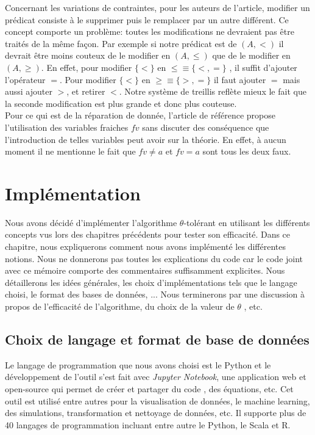 \documentclass[letterpaper, 12pt]{report}
\theoremstyle{definition}
\begin{document}
Concernant les variations de contraintes, pour les auteurs de l'article, modifier un prédicat consiste à le supprimer puis le remplacer par un autre différent. Ce concept comporte un problème: toutes les modifications ne devraient pas être traités de la même façon. Par exemple si notre prédicat est de $(A,<)$ il devrait être moins couteux de le modifier en $(A,\leq)$ que de le modifier en $(A, \geq)$. En effet, pour modifier $\{ < \}$ en $ \leq \equiv \{<,= \}$ , il suffit d'ajouter l'opérateur $=$. Pour modifier $\{ <\}$ en $\geq \equiv \{ >,=\}$ il faut ajouter $=$ mais aussi ajouter $>$, et retirer $<$. Notre système de treillis reflète mieux le fait que la seconde modification est plus grande et donc plus couteuse.\\

Pour ce qui est de la réparation de donnée, l'article de référence propose l'utilisation des variables fraiches $fv$ sans discuter des conséquence que l'introduction de telles variables peut avoir sur la théorie. En effet, à aucun moment il ne mentionne le fait que $fv \neq a$ et $fv = a$ sont tous les deux faux.

\chapter{Implémentation}

Nous avons décidé d'implémenter l'algorithme $\theta$-tolérant en utilisant les différents concepts vus lors des chapitres précédents pour tester son efficacité. Dans ce chapitre, nous expliquerons comment nous avons implémenté les différentes notions. Nous ne donnerons pas toutes les explications du code car le code joint avec ce mémoire comporte des commentaires suffisamment explicites. Nous détaillerons les idées générales, les choix d'implémentations tels que le langage choisi, le format des bases de données, ... Nous terminerons par une discussion à propos de l'efficacité de l'algorithme, du choix de la valeur de $\theta$ , etc.

\section{Choix de langage et format de base de données}

Le langage de programmation que nous avons choisi est le Python et le développement de l'outil s'est fait avec \emph{Jupyter Notebook}, une application web et open-source qui permet de créer et partager du code , des équations, etc. Cet outil est utilisé entre autres pour la visualisation de données, le machine learning, des simulations, transformation et nettoyage de données, etc. Il supporte plus de 40 langages de programmation incluant entre autre le Python, le Scala et R.
\end{document}
